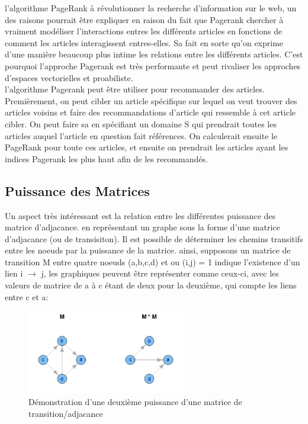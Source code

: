 \documentclass[oneside]{book}
\begin{document}
l'algorithme PageRank à révolutionner la recherche d'information sur le web, un des raisons pourrait être expliquer en raison du fait que Pagerank chercher à vraiment modéliser l'interactions entres les différents articles en fonctions de comment les articles interagissent entres-elles. Sa fait en sorte qu'on exprime d'une manière beaucoup plus intime les relations entre les différents articles. C'est pourquoi l'approche Pagerank est très performante et peut rivaliser les approches d'espaces vectorielles et proabiliste.\\

l'algorithme Pagerank peut être utiliser pour recommander des articles. Premièrement, on peut cibler un article spécifique sur lequel on veut trouver des articles voisins et faire des recommandations d'article qui ressemble à cet article cibler. On peut faire sa en spécifiant un domaine S qui prendrait toutes les articles auquel l'article en question fait références. On calculerait ensuite le PageRank pour toute ces articles, et ensuite on prendrait les articles ayant les indices Pagerank les plus haut afin de les recommandés.\\

\subsection{Puissance des Matrices}
Un aspect très intéressant est la relation entre les différentes puissance des matrice d'adjacance. en représentant un graphe sous la forme d'une matrice d'adjacance (ou de transisiton). Il est possible de déterminer les chemins transitifs entre les noeuds par la puissance de la matrice. ainsi, supposons un matrice de transition M entre quatre noeuds (a,b,c,d) et ou (i,j) = 1 indique l'existence d'un lien i $\rightarrow$ j, les graphiques peuvent être représenter comme ceux-ci, avec les valeurs de matrice de a à c étant de deux pour la deuxième, qui compte les liens entre c et a:\\

\begin{figure}
\centering
\includegraphics[width = 7cm]{transition.png}
\caption{Démonstration d'une deuxième puissance d'une matrice de transition/adjacance}
\label{fig:transition}
\end{figure}
\end{document}
